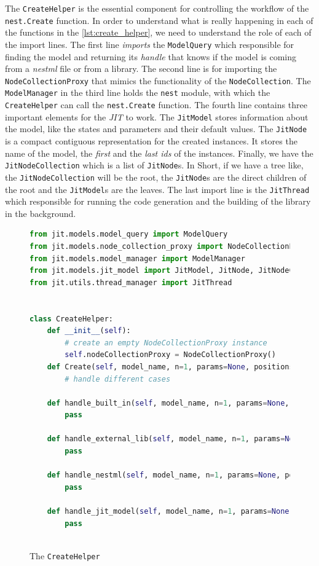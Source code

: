 The \texttt{CreateHelper} is the essential component for controlling the workflow of the \texttt{nest.Create} function. In order to understand what is really happening in each of the functions in the \autoref{lst:create_helper}, we need to understand the role of each of the import lines. The first line \emph{imports} the \texttt{ModelQuery} which responsible for finding the model and returning its \emph{handle} that knows if the model is coming from a \emph{nestml} file or from a library. The second line is for importing the \texttt{NodeCollectionProxy} that mimics the functionality of the \texttt{NodeCollection}. The \texttt{ModelManager} in the third line holds the \texttt{nest} module, with which the \texttt{CreateHelper} can call the \texttt{nest.Create} function. The fourth line contains three important elements for the \emph{JIT} to work. The \texttt{JitModel} stores information about the model, like the states and parameters and their default values. The \texttt{JitNode} is a compact contiguous representation for the created instances. It stores the name of the model, the \emph{first} and the \emph{last ids} of the instances. Finally, we have the \texttt{JitNodeCollection} which is a list of \texttt{JitNode}s. In Short, if we have a tree like, the \texttt{JitNodeCollection} will be the root, the \texttt{JitNode}s are the direct children of the root and the \texttt{JitModel}s are the leaves. The last import line is the \texttt{JitThread} which responsible for running the code generation and the building of the library in the background.
\begin{figure}[ht!]
    \centering
    \begin{lstlisting}[language=Python, label=lst:create_helper]
from jit.models.model_query import ModelQuery
from jit.models.node_collection_proxy import NodeCollectionProxy
from jit.models.model_manager import ModelManager
from jit.models.jit_model import JitModel, JitNode, JitNodeCollection
from jit.utils.thread_manager import JitThread


class CreateHelper:
    def __init__(self):
        # create an empty NodeCollectionProxy instance
        self.nodeCollectionProxy = NodeCollectionProxy()
    def Create(self, model_name, n=1, params=None, positions=None):
        # handle different cases
        
    def handle_built_in(self, model_name, n=1, params=None, positions=None):
        pass
        
    def handle_external_lib(self, model_name, n=1, params=None, positions=None):
        pass
    
    def handle_nestml(self, model_name, n=1, params=None, positions=None): 
        pass
        
    def handle_jit_model(self, model_name, n=1, params=None, positions=None):
        pass
    
\end{lstlisting}
    \caption{The \texttt{CreateHelper}}
\end{figure}

